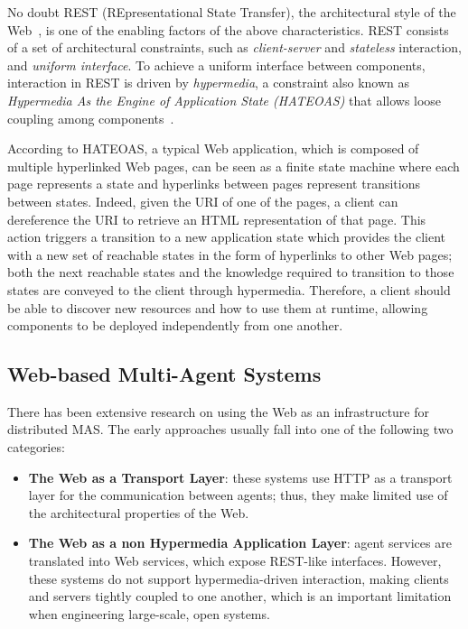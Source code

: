 No doubt REST (REpresentational State Transfer), the architectural style of the Web~\cite{fielding2000}, is one of the enabling factors of the above characteristics.
REST consists of a set of architectural constraints, such as \textit{client-server} and \textit{stateless} interaction, and \textit{uniform interface}.
To achieve a uniform interface between components, interaction in REST is driven by \textit{hypermedia}, a constraint also known as \textit{Hypermedia As the Engine of Application State (HATEOAS)} that allows loose coupling among components~\cite{Varanasi2015}.

According to HATEOAS, a typical Web application, which is composed of multiple hyperlinked Web pages, can be seen as a finite state machine where each page represents a state and hyperlinks between pages represent transitions between states.
Indeed, given the URI of one of the pages, a client can dereference the URI to retrieve an HTML representation of that page.
This action triggers a transition to a new application state which provides the client with a new set of reachable states in the form of hyperlinks to other Web pages; both the next reachable states and the knowledge required to transition to those states are conveyed to the client through hypermedia.
Therefore, a client should be able to discover new resources and how to use them at runtime, allowing components to be deployed independently from one another.

\subsection{Web-based Multi-Agent Systems}
There has been extensive research on using the Web as an infrastructure for distributed MAS.
The early approaches usually fall into one of the following two categories:
\begin{itemize}
    \item \textbf{The Web as a Transport Layer}: these systems use HTTP as a transport layer for the communication between agents; thus, they make limited use of the architectural properties of the Web.
    \item \textbf{The Web as a non Hypermedia Application Layer}: agent services are translated into Web services, which expose REST-like interfaces.
    However, these systems do not support hypermedia-driven interaction, making clients and servers tightly coupled to one another, which is an important limitation when engineering large-scale, open systems.
\end{itemize}

